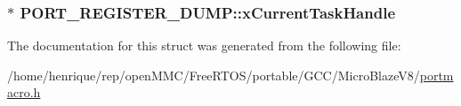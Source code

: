 \hypertarget{structPORT__REGISTER__DUMP_a40972c15da30cd54bcc8ec97e4b5db7b}{
\subsubsection[{x\-Current\-Task\-Handle}]{ $\ast$ P\-O\-R\-T\-\_\-\-R\-E\-G\-I\-S\-T\-E\-R\-\_\-\-D\-U\-M\-P\-::x\-Current\-Task\-Handle}}\label{structPORT__REGISTER__DUMP_a40972c15da30cd54bcc8ec97e4b5db7b}


The documentation for this struct was generated from the following file\-:\begin{DoxyCompactItemize}
\item 
/home/henrique/rep/open\-M\-M\-C/\-Free\-R\-T\-O\-S/portable/\-G\-C\-C/\-Micro\-Blaze\-V8/\hyperlink{GCC_2MicroBlazeV8_2portmacro_8h}{portmacro.\-h}\end{DoxyCompactItemize}
